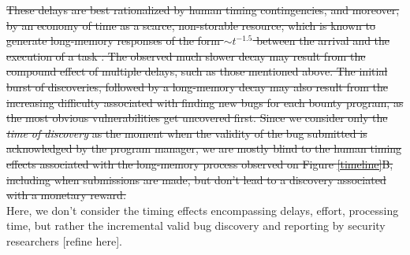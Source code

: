 \sout{These delays are best rationalized by human timing contingencies, and moreover, by an economy of time as a scarce, non-storable resource, which is known to generate long-memory responses of the form $\sim t^{-1.5}$ between the arrival and the execution of a task \cite{maillart2011quantification}. The observed much slower decay may result from the compound effect of multiple delays, such as those mentioned above. The initial burst of discoveries, followed by a long-memory decay may also result from the increasing difficulty associated with finding new bugs for each bounty program, as the most obvious vulnerabilities get uncovered first.  Since we consider only the {\it time of discovery} as the moment when the validity of the bug submitted is acknowledged by the program manager, we are mostly blind to the human timing effects associated with the long-memory process observed on Figure \ref{timeline}B, including when submissions are made, but don't lead to a discovery associated with a monetary reward.}\\

Here, we don't consider the timing effects encompassing delays, effort, processing time, but rather the incremental valid bug discovery and reporting by security researchers [refine here].

